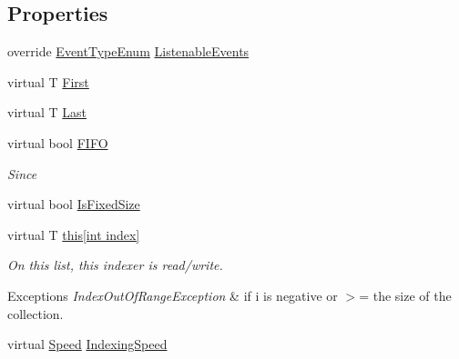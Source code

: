 \subsection*{Properties}
\begin{DoxyCompactItemize}
\item 
override \hyperlink{namespace_c5_a9143bfd561fffa025d21561674758008}{Event\+Type\+Enum} \hyperlink{class_c5_1_1_hashed_linked_list_a2eab2146c49daf255c542b957656b25c}{Listenable\+Events}
\item 
virtual T \hyperlink{class_c5_1_1_hashed_linked_list_a364ea12660521152709ecb6ea0ff231d}{First}
\item 
virtual T \hyperlink{class_c5_1_1_hashed_linked_list_ab47e317103cce4499a55bac8b1aac351}{Last}
\item 
virtual bool \hyperlink{class_c5_1_1_hashed_linked_list_a177c8639ed7154131ac278bac877fd0c}{F\+I\+F\+O}
\begin{DoxyCompactList}\small\item\em Since \end{DoxyCompactList}\item 
virtual bool \hyperlink{class_c5_1_1_hashed_linked_list_ae5328883cfc6d4f3415635f4fd2fb0fc}{Is\+Fixed\+Size}
\item 
virtual T \hyperlink{class_c5_1_1_hashed_linked_list_aacd03b9a2e43ade0185cf745b3374994}{this\mbox{[}int index\mbox{]}}
\begin{DoxyCompactList}\small\item\em On this list, this indexer is read/write. 
\begin{DoxyExceptions}{Exceptions}
{\em Index\+Out\+Of\+Range\+Exception} & if i is negative or $>$= the size of the collection. \\
\hline
\end{DoxyExceptions}
\end{DoxyCompactList}\item 
virtual \hyperlink{namespace_c5_a615ba88dcdaa8d5a3c5f833a73d7fad6}{Speed} \hyperlink{class_c5_1_1_hashed_linked_list_aa72a5381efc4af4311dabc4b1b214ec4}{Indexing\+Speed}

\end{DoxyCompactItemize}
